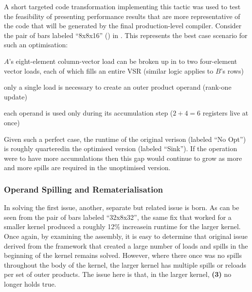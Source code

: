 \documentclass[\main/thesis.tex]{subfiles}
\begin{document}
A short targeted code transformation implementing this tactic was used to test the feasibility of presenting performance results that are more representative of the code that will be generated by the final production-level compiler.
Consider the pair of bars labeled ``8x8x16'' () in .
This represents the best case scenario for such an optimisation:
\begin{enumerate*}[itemjoin={{; }}, itemjoin*={{; and }}, label=\textbf{(\arabic*)}, after={.}]
  \item $A$'s eight-element column-vector load can be broken up in to two four-element vector loads, each of which fills an entire VSR (similar logic applies to $B$'s rows)
  \item only a single load is necessary to create an outer product operand (rank-one update)
  \item each operand is used only during its accumulation step ($2+4=6$ registers \gls{live} at once)
\end{enumerate*}
Given such a perfect case, the runtime of the original verison (labeled ``No Opt'') is roughly quartered\footnotemark in the optimised version (labeled ``Sink'').
If the operation were to have more accumulations then this gap would continue to grow as more and more spills are required in the unoptimised version.

\subsubsection{Operand Spilling and Rematerialisation}
In solving the first issue, another, separate but related issue is born.
As can be seen from the pair of bars labeled ``32x8x32'', the same fix that worked for a smaller kernel produced a roughly 12\% increase\footnotemark in runtime for the larger kernel.
Once again, by examining the assembly, it is easy to determine that original issue derived from the framework that created a large number of loads and spills in the beginning of the kernel remains solved.
However, where there once was no spills throughout the body of the kernel, the larger kernel has multiple spills or reloads per set of outer products.
The issue here is that, in the larger kernel, \textbf{(3)} no longer holds true.
\end{document}
